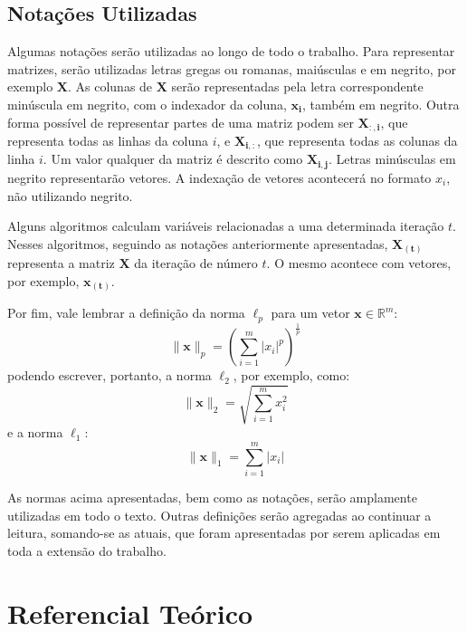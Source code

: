\documentclass[cic,tc]{iiufrgs}
\renewcommand{\vec}[1]{\bm{#1}}
\newcommand{\mat}[1]{\bm{#1}}
\begin{document}
\section{Notações Utilizadas}
Algumas notações serão utilizadas ao longo de todo o trabalho.
Para representar matrizes, serão utilizadas letras gregas ou romanas, 
maiúsculas e em negrito, por exemplo $\mat{X}$.
As colunas de $\mat{X}$ serão representadas pela letra correspondente 
minúscula em negrito, com o indexador da coluna, $\vec{x_i}$, também em negrito.
Outra forma possível de representar partes de uma matriz podem ser $\mat{X_{:,i}}$,
que representa todas as linhas da coluna $i$, e $\mat{X_{i,:}}$, que representa 
todas as colunas da linha $i$.
Um valor qualquer da matriz é descrito como $\mat{X_{i,j}}$.
Letras minúsculas em negrito representarão vetores.
A indexação de vetores acontecerá no formato $x_i$, não utilizando negrito. %

Alguns algoritmos calculam variáveis relacionadas a uma determinada iteração $t$.
Nesses algoritmos, seguindo as notações anteriormente apresentadas, $\mat{X_{(t)}}$ 
representa a matriz $\mat{X}$ da iteração de número $t$.
O mesmo acontece com vetores, por exemplo, $\vec{x_{(t)}}$.

Por fim, vale lembrar a definição da norma $\ell_p$ para um vetor $\vec{x} \in \mathbb{R}^m$:
\begin{equation*}
    \lVert \vec{x} \rVert_p = 
    \left( \sum_{i=1}^m {|x_i|^p} \right)^{\frac{1}{p}}
\end{equation*}
podendo escrever, portanto, a norma $\ell_2$, por exemplo, como:
\begin{equation*}
    \lVert \vec{x} \rVert_2 = 
    \sqrt{\sum_{i=1}^m {x_i^2}}
\end{equation*}
e a norma $\ell_1$:
\begin{equation*}
    \lVert \vec{x} \rVert_1 = 
    \sum_{i=1}^m {|x_i|}
\end{equation*}

As normas acima apresentadas, bem como as notações, serão amplamente utilizadas
em todo o texto. 
Outras definições serão agregadas ao continuar a leitura, somando-se as atuais, 
que foram apresentadas por serem aplicadas em toda a extensão do trabalho.

\chapter{Referencial Teórico}
\label{cap:ref}
\end{document}
